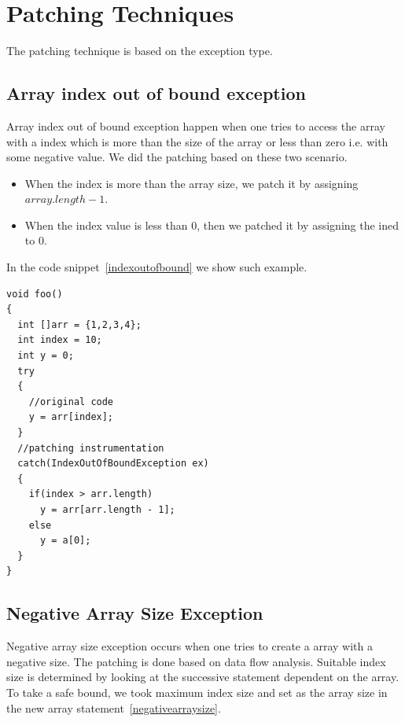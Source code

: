 \section{Patching Techniques}
\label{subsec:patchCA}

The patching technique is based on the exception type. 

\subsection{Array index out of bound exception}

Array index out of bound exception happen when one tries to access the array
with a index which is more than the size of the array or less than zero i.e.
with some negative value. We did the patching based on these two scenario.

\begin{itemize}
  \item When the index is more than the array size, we patch it by assigning
  $array.length - 1$.
  \item When the index value is less than $0$, then we patched it by assigning
  the ined to $0$.
\end{itemize}

In the code snippet~\ref{indexoutofbound} we show such example.


\onehalfspacing

\lstset{language=Java, caption=array index out of bound patching,
label=indexoutofbound}

\begin{lstlisting}
void foo()
{
  int []arr = {1,2,3,4};
  int index = 10;
  int y = 0;
  try
  {
    //original code
    y = arr[index];
  }
  //patching instrumentation
  catch(IndexOutOfBoundException ex)
  {
    if(index > arr.length)
      y = arr[arr.length - 1];
    else
      y = a[0];
  }
}

\end{lstlisting}

\doublespacing
\subsection{Negative Array Size Exception}

Negative array size exception occurs when one tries to create a array with a
negative size.
The patching is done based on data flow analysis. Suitable index size is
determined by looking at the successive statement dependent on the array.
To take a safe bound, we took maximum index size and set as the array size in
the new array statement~\ref{negativearraysize}.


